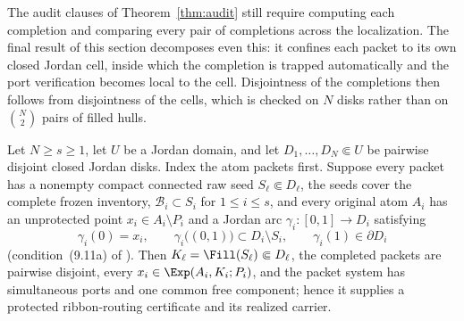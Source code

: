 The audit clauses of Theorem~\ref{thm:audit} still require computing each completion
and comparing every pair of completions across the localization. The final result of
this section decomposes even this: it confines each packet to its own closed Jordan
cell, inside which the completion is trapped automatically and the port verification
becomes local to the cell. Disjointness of the completions then follows from
disjointness of the cells, which is checked on $N$ disks rather than on
$\binom N2$ pairs of filled hulls.

\begin{proposition}\label{prop:cellwise}
Let $N\ge s\ge1$, let $U$ be a Jordan domain, and let
$D_1,\dots,D_N\Subset U$ be pairwise disjoint
closed Jordan disks.  Index the atom packets first.  Suppose every packet
has a nonempty compact connected raw seed
$S_\ell\Subset D_\ell$, the seeds cover the complete frozen inventory,
$\mathcal B_i\subset S_i$ for $1\le i\le s$, and every original atom $A_i$ has an
unprotected point $x_i\in A_i\setminus P_i$
and a Jordan arc $\gamma_i\colon[0,1]\to D_i$ satisfying
\begin{equation}\label{eq:E-arc-condition}
\gamma_i(0)=x_i,
\qquad
\gamma_i\bigl((0,1)\bigr)\subset D_i\setminus S_i,
\qquad
\gamma_i(1)\in\partial D_i
\end{equation}
(condition~(9.11a) of \cite{MWman}). Then $K_\ell=\Fill(S_\ell)\Subset D_\ell$, the
completed packets are pairwise disjoint, every $x_i\in\Exp(A_i,K_i;P_i)$, and the
packet system has simultaneous ports and one common free component; hence
it supplies a protected ribbon-routing certificate and its realized
carrier.
\end{proposition}


